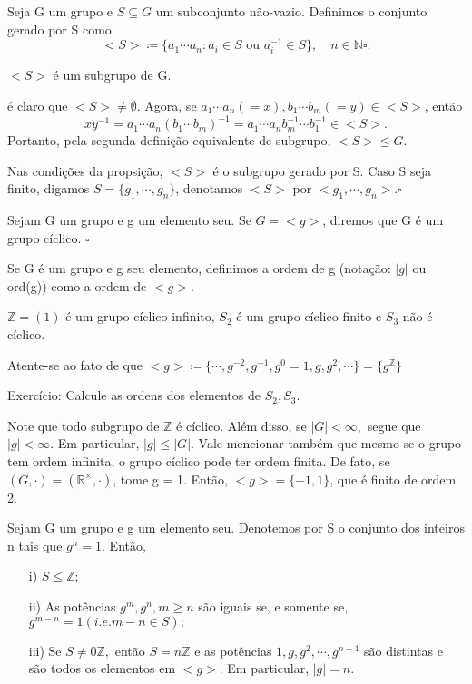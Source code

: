 \documentclass[algebra_notes.tex]{subfiles}
\begin{document}
\begin{def*}
	Seja G um grupo e $S\subseteq{G}$ um subconjunto não-vazio. Definimos o conjunto gerado por S como
	$$
		<S>\coloneqq \biggl\{a_{1}\cdots a_{n}: a_{i}\in S\text{ ou }a_{i}^{-1}\in{S}\biggr\}, \quad n\in \mathbb{N}\square.
	$$
\end{def*}
\begin{prop*}
	$<S>$ é um subgrupo de G.
\end{prop*}
\begin{proof*}
	é claro que $<S> \neq\emptyset$. Agora, se $a_{1}\cdots a_{n} (= x), b_{1}\cdots b_{m}(= y)\in <S>$, então
	$$
		xy^{-1} = a_{1} \cdots a_{n}(b_{1}\cdots b_{m})^{-1} = a_{1}\cdots a_{n}b_{m}^{-1}\cdots b_{1}^{-1}\in <S>.
	$$
	Portanto, pela segunda definição equivalente de subgrupo, $<S>\leq{G}.$ \qedsymbol
\end{proof*}
\begin{def*}
	Nas condições da propsição, $<S>$ é o subgrupo gerado por S. Caso S seja finito, digamos $S=\{g_{1},\cdots, g_{n}\}$, denotamos
	$<S>$ por $<g_{1}, \cdots, g_{n}>.\square$
\end{def*}
\begin{def*}
	Sejam G um grupo e g um elemento seu. Se $G=<g>$, diremos que G é um grupo cíclico. $\square$
\end{def*}
\begin{def*}
	Se G é um grupo e g seu elemento, definimos a ordem de g (notação: $|g|$ ou ord(g)) como a ordem de $<g>$.
\end{def*}
\begin{example*}
	$\mathbb{Z} = (1)$ é um grupo cíclico infinito, $S_{2}$ é um grupo cíclico finito e $S_{3}$ não é cíclico. \qedsymbol
\end{example*}
Atente-se ao fato de que $<g>\coloneqq\{\cdots, g^{-2}, g^{-1}, g^{0}=1, g, g^{2}, \cdots\} = \{g^{\mathbb{Z}}\} $
\begin{example*}
	Exercício: Calcule as ordens dos elementos de $S_{2}, S_{3}.$
\end{example*}
Note que todo subgrupo de $\mathbb{Z}$ é cíclico. Além disso, se $|G|<\infty,$ segue que $|g|<\infty$. Em particular,
$|g|\leq{|G|}$. Vale mencionar também que mesmo se o grupo tem ordem infinita, o grupo cíclico pode ter ordem finita. De fato,
se $(G, \cdot) = (\mathbb{R}^{\times}, \cdot)$, tome g = 1. Então, $<g> = \{-1, 1\}$, que é finito de ordem 2.
\begin{prop*}
	Sejam G um grupo e g um elemento seu. Denotemos por S o conjunto dos inteiros n tais que $g^{n} = 1.$ Então,
	\begin{itemize}
		\item[i)]$S\leq{\mathbb{Z}}$;
		\item[ii)]As potências $g^{m}, g^{n}, m\geq{n}$ são iguais se, e somente se, $g^{m-n} = 1(i.e. m-n\in S);$
		\item[iii)] Se $S\neq0 \mathbb{Z},$ então $S=n\mathbb{Z}$ e as potências $1, g, g^{2}, \cdots, g^{n-1}$ são distintas e
		      são todos os elementos em $<g>.$ Em particular, $|g|=n.$
	\end{itemize}
\end{prop*}
\end{document}
